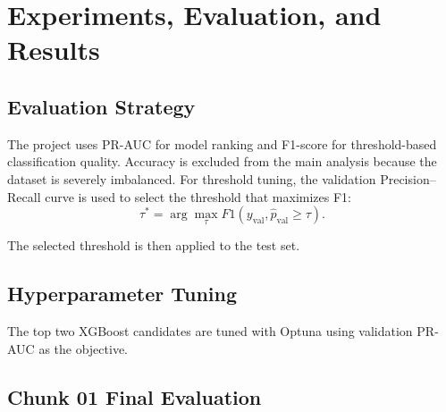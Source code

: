 \documentclass[12pt,a4paper,twoside]{article}
\begin{document}
\clearpage
\section{Experiments, Evaluation, and Results}

\subsection{Evaluation Strategy}

The project uses PR-AUC for model ranking and F1-score for threshold-based classification quality. Accuracy is excluded from the main analysis because the dataset is severely imbalanced. For threshold tuning, the validation Precision--Recall curve is used to select the threshold that maximizes F1:
\begin{equation}
    \tau^* = \arg\max_{\tau} F1(y_{\text{val}}, \hat{p}_{\text{val}} \ge \tau).
\end{equation}

The selected threshold is then applied to the test set.

\subsection{Hyperparameter Tuning}

The top two XGBoost candidates are tuned with Optuna using validation PR-AUC as the objective.

\begin{table}[H]
\centering
\caption{Best tuned XGBoost hyperparameters}
\end{table}

\subsection{Chunk 01 Final Evaluation}
\end{document}
